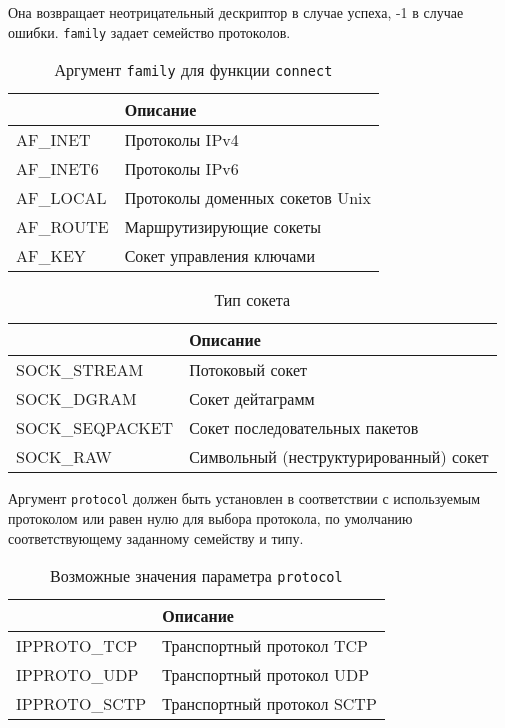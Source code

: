 Она возвращает неотрицательный дескриптор в случае успеха, -1 в случае ошибки. \lstinline{family} задает семейство протоколов.
\begin{table}[h!]
  \caption{Аргумент \lstinline{family} для функции \lstinline{connect}}
  \begin{center}
    \begin{tabular}{p{2.5cm}l}
      \toprule
      & \textbf{Описание} \\
      \midrule
      AF\_INET & Протоколы IPv4 \\
      AF\_INET6 & Протоколы IPv6 \\
      AF\_LOCAL & Протоколы доменных сокетов Unix \\
      AF\_ROUTE & Маршрутизирующие сокеты \\
      AF\_KEY & Сокет управления ключами \\
      \bottomrule
    \end{tabular}
  \end{center}
\end{table}

\begin{table}[h!]
  \caption{Тип сокета}
  \begin{center}
    \begin{tabular}{p{3.5cm}l}
      \toprule
      & \textbf{Описание} \\
      \midrule
      SOCK\_STREAM & Потоковый сокет \\
      SOCK\_DGRAM & Сокет дейтаграмм \\
      SOCK\_SEQPACKET & Сокет последовательных пакетов \\
      SOCK\_RAW & Символьный (неструктурированный) сокет \\
      \bottomrule
    \end{tabular}
  \end{center}
\end{table}

 Аргумент \lstinline{protocol} должен быть установлен в соответствии с используемым протоколом или равен нулю для выбора протокола, по умолчанию соответствующему заданному семейству и типу.
\begin{table}[h!]
  \caption{Возможные значения параметра \lstinline{protocol}}
  \begin{center}
    \begin{tabular}{p{3cm}l}
      \toprule
      & \textbf{Описание} \\
      \midrule
      IPPROTO\_TCP & Транспортный протокол TCP \\
      IPPROTO\_UDP & Транспортный протокол UDP \\
      IPPROTO\_SCTP & Транспортный протокол SCTP \\
      \bottomrule
    \end{tabular}
  \end{center}
\end{table}


